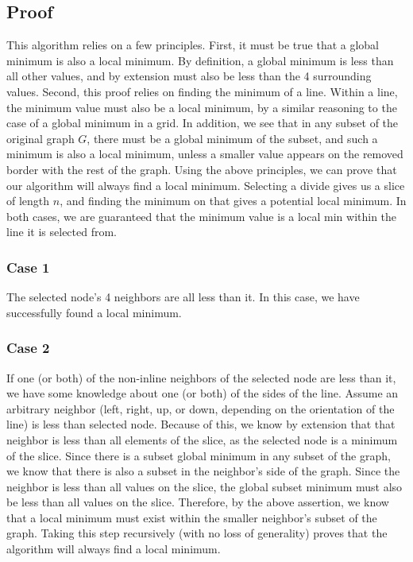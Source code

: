 \documentclass[titlepage]{article}
\numberwithin{equation}{subsection}
\begin{document}
\subsection{Proof}
This algorithm relies on a few principles. First, it must be true that a global minimum is also
a local minimum. By definition, a global minimum is less than all other values, and by extension
must also be less than the 4 surrounding values. Second, this proof relies on finding the minimum of
a line. Within a line, the minimum value must also be a local minimum, by a similar reasoning to the case
of a global minimum in a grid. In addition, we see that in any subset of the original graph $G$, there must
be a global minimum of the subset, and such a minimum is also a local minimum, unless a smaller value appears
on the removed border with the rest of the graph. Using the above principles, we can prove that our algorithm
will always find a local minimum. Selecting a divide gives us a slice of length $n$, and finding the minimum
on that gives a potential local minimum. In both cases, we are guaranteed that the minimum value is a local
min within the line it is selected from.
\subsubsection{Case 1}
The selected node's 4 neighbors are all less than it. In this case, we have successfully found a local minimum.
\subsubsection{Case 2}
If one (or both) of the non-inline neighbors of the selected node are less than it, we have some knowledge about
one (or both) of the sides of the line. Assume an arbitrary neighbor (left, right, up, or down, depending on
the orientation of the line) is less than selected node. Because of this, we know by extension that that neighbor
is less than all elements of the slice, as the selected node is a minimum of the slice. Since there is a subset global
minimum in any subset of the graph, we know that there is also a subset in the neighbor's side of the graph. 
Since the neighbor is less than all values on the slice, the global subset minimum must also be less than
all values on the slice. Therefore, by the above assertion, we know that a local minimum must exist within the
smaller neighbor's subset of the graph. Taking this step recursively (with no loss of generality) proves that
the algorithm will always find a local minimum.
\end{document}
